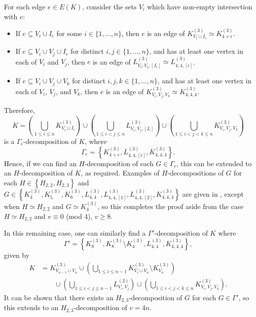 For each edge $e \in E(K)$, consider the sets $V_i$ which have non-empty intersection with $e$:
\begin{itemize}
    \item If $e \subseteq V_i \cup I_\epsilon$ for some $i \in \{1,\ldots,n\}$, then $e$ is an edge of $K_{V_i \cup I_\epsilon}^{(3)} \simeq K_{4+\epsilon}^{(3)}$.
    \item If $e \subseteq V_i \cup V_j \cup I_\epsilon$ for distinct $i, j \in \{1,\ldots,n\}$, and has at least one vertex in each of $V_i$ and $V_j$, then $e$ is an edge of $L_{V_i,V_j,[I_\epsilon]}^{(3)} \simeq L_{4,4,[\epsilon]}^{(3)}$.
    \item If $e \subseteq V_i \cup V_j \cup V_k$ for distinct $i, j, k \in \{1,\ldots,n\}$, and has at least one vertex in each of $V_i$, $V_j$, and $V_k$, then $e$ is an edge of $K_{V_i,V_j,V_k}^{(3)} \simeq K_{4,4,4}^{(3)}$.
\end{itemize}
Therefore,
\[
    K
    = \left( \bigcup_{1 \leq i \leq n} K_{V_i \cup I_\epsilon}^{(3)} \right)
    \cup \left( \bigcup_{1 \leq i < j \leq n} L_{V_i,V_j,[I_\epsilon]}^{(3)} \right)
    \cup \left( \bigcup_{1 \leq i < j < k \leq n} K_{V_i,V_j,V_k}^{(3)} \right)
\]
is a $\Gamma_\epsilon$-decomposition of $K$, where
\[
    \Gamma_\epsilon = \left\{ K_{4+\epsilon}^{(3)}, L_{4,4,[\epsilon]}^{(3)}, K_{4,4,4}^{(3)} \right\}.
\]
Hence, if we can find an $H$-decomposition of each $G \in \Gamma_\epsilon$, this can be extended to an $H$-decomposition of $K$, as required.
Examples of $H$-decompositions of $G$ for each $H \in \left\{ H_{2,2}, H_{2,3} \right\}$
and $G \in \left\{ K_{4}^{(3)}, K_{5}^{(3)}, K_{6}^{(3)}, L_{4,4}^{(3)}, L_{4,4,[1]}^{(3)}, L_{4,4,[2]}^{(3)}, K_{4,4,4}^{(3)} \right\}$
are given in \cite{bryant}, except when $H \simeq H_{2,2}$ and $G \simeq K_{4}^{(3)}$,
so this completes the proof aside from the case $H \simeq H_{2,2}$ and $v \equiv 0$ (mod $4$), $v \geq 8$.

In this remaining case, one can similarly find a $\Gamma'$-decomposition of $K$ where
\[
    \Gamma' = \left\{ K_{8}^{(3)}, K_{8}^{(3)} \setminus K_{4}^{(3)}, L_{4,4}^{(3)}, K_{4,4,4}^{(3)} \right\},
\]
given by
\begin{align*}
    K &= K_{V_{n-1} \cup V_n}^{(3)}
    \cup \left( \bigcup_{1 \leq i \leq n-1} K_{V_i \cup V_n}^{(3)} \setminus K_{V_n}^{(3)} \right) \\
    & \quad \quad \cup \left( \bigcup_{1 \leq i < j \leq n-1} L_{V_i, V_j}^{(3)} \right)
    \cup \left( \bigcup_{1 \leq i < j < k \leq n} K_{V_i, V_j, V_k}^{(3)} \right).
\end{align*}
It can be shown that there exists an $H_{2,3}$-decomposition of $G$ for each $G \in \Gamma'$, so this extends to
an $H_{2,3}$-decomposition of $v = 4n$.

